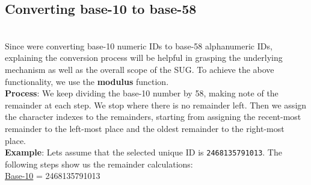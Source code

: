 \subsection{Converting base-10 to base-58}\label{kjmxXaC97nY-xukZQoO7h}
\\
Since we\textquotesingle re converting base-10 numeric IDs to base-58 alphanumeric IDs, explaining the conversion process will be helpful in grasping the underlying mechanism as well as the overall scope of the SUG. To achieve the above functionality, we use the \textbf{modulus} function.
\\
\textbf{Process}: We keep dividing the base-10 number by 58, making note of the remainder at each step. We stop where there is no remainder left. Then we assign the character indexes to the remainders, starting from assigning the recent-most remainder to the left-most place and the oldest remainder to the right-most place.
\\
\textbf{Example}: Let\textquotesingle s assume that the selected unique ID is \texttt{2468135791013}. The following steps show us the remainder calculations:
\\
\ul{Base-10} = 2468135791013

